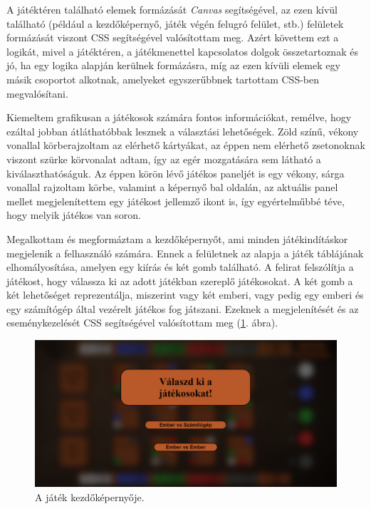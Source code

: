 
A játéktéren található elemek formázását \textit{Canvas} segítségével, az ezen kívül található (például a kezdőképernyő, játék végén felugró felület, stb.) felületek formázását viszont CSS segítségével valósítottam meg. Azért követtem ezt a logikát, mivel a játéktéren, a játékmenettel kapcsolatos dolgok összetartoznak és jó, ha egy logika alapján kerülnek formázásra, míg az ezen kívüli elemek egy másik csoportot alkotnak, amelyeket egyszerűbbnek tartottam CSS-ben megvalósítani.


Kiemeltem grafikusan a játékosok számára fontos információkat, remélve, hogy ezáltal jobban átláthatóbbak lesznek a választási lehetőségek. Zöld színű, vékony vonallal körberajzoltam az elérhető kártyákat, az éppen nem elérhető zsetonoknak viszont szürke körvonalat adtam, így az egér mozgatására sem látható a kiválaszthatóságuk. Az éppen körön lévő játékos paneljét is egy vékony, sárga vonallal rajzoltam körbe, valamint a képernyő bal oldalán, az aktuális panel mellet megjelenítettem egy játékost jellemző ikont is, így egyértelműbbé téve, hogy melyik játékos van soron.


Megalkottam és megformáztam a kezdőképernyőt, ami minden játékindításkor megjelenik a felhasználó számára. Ennek a felületnek az alapja a játék táblájának elhomályosítása, amelyen egy kiírás és két gomb található. A felirat felszólítja a játékost, hogy válassza ki az adott játékban szereplő játékosokat. A két gomb a két lehetőséget reprezentálja, miszerint vagy két emberi, vagy pedig egy emberi és egy számítógép által vezérelt játékos fog játszani. Ezeknek a megjelenítését és az eseménykezelését CSS segítségével valósítottam meg (\ref{fig:start_screen}. ábra).

\begin{figure}[h]
\centering
\includegraphics[width=\textwidth]{images/start_screen.png}
\caption{A játék kezdőképernyője.}
\label{fig:start_screen}
\end{figure}


